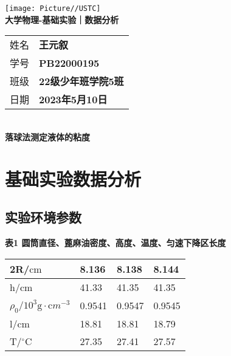 \documentclass[10pt,a4paper]{article}	%
\makeatletter
\newcommand{\nexp}{落球法测定液体的粘度}
\newenvironment{tablehere}
{\def\@captype{table}}
{}
\makeatother
\begin{document}
	\vspace*{-5em}
	\begin{center}
		\texttt{[image: Picture//USTC]}\\
		\Large \textbf{大学物理-基础实验｜数据分析}\\[5mm]

		\normalsize
		\begin{tabular}{ll}
			姓名 & \textbf{王元叙}\\
			学号 & \textbf{PB22000195}\\
			班级 & \textbf{22级少年班学院5班}\\
			日期 & \textbf{2023年5月10日}\\	
		\end{tabular}\\[5mm]

		\LARGE \textbf{\nexp}\\[5mm]	

	\end{center}

	\section{基础实验数据分析}

	\subsection{实验环境参数}

	\begin{tablehere}
		\caption*{\bf 表1 圆筒直径、蓖麻油密度、高度、温度、匀速下降区长度}
		\noindent
		\begin{center}
			\begin{tabularx}{0.65\linewidth}{|X|Y|Y|Y|}
				\hline
				2R/$\mathrm {cm}$                            & 8.136  & 8.138  & 8.144  \\ \hline
				h/$\mathrm {cm}$                             & 41.33  & 41.35  & 41.35  \\ \hline
				$\rho_0$/$10^3{\mathrm g}\cdot{\mathrm cm}^{-3}$ & 0.9541 & 0.9547 & 0.9545 \\ \hline
				l/$\mathrm {cm}$                             & 18.81  & 18.81  & 18.79  \\ \hline
				T/$^\circ\mathrm C$                          & 27.35  & 27.41  & 27.57  \\ \hline
			\end{tabularx}
		\end{center}
		\vspace*{1em}
	\end{tablehere}
\end{document}

